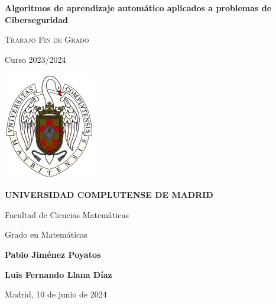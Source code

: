 \documentclass[11pt, a4paper]{article} %
\begin{document}
\begin{titlepage}
	
	\vspace*{1.7cm}
	
    \centering

	
	{\LARGE \textbf{Algoritmos de aprendizaje automático aplicados a problemas de Ciberseguridad}\par}
    \vspace{1.3cm}
    {\LARGE \textsc{Trabajo Fin de Grado}\par}
    \vspace{1.1cm}
    {\Large Curso 2023/2024\par}
    \vfill
	
    \includegraphics[width=0.3\textwidth]{logo_UCM.png}\par
    \vspace{1cm}
    {\LARGE \textsc{\textbf{UNIVERSIDAD COMPLUTENSE DE MADRID}}\par}
    \vspace{0.5cm}
    {\large Facultad de Ciencias Matemáticas\par}
    \vspace{0.5cm}
    {\large Grado en Matemáticas\par}
    \vfill

    

    \begin{minipage}{0.45\textwidth}
        \begin{flushleft}
            \textbf{Pablo Jiménez Poyatos}
        \end{flushleft}
    \end{minipage}
    
    \vspace{0.5cm}
    
    \begin{minipage}{0.45\textwidth}
        \begin{flushleft}
            \textbf{Luis Fernando Llana Díaz}
        \end{flushleft}
    \end{minipage}

    \vfill
    \vfill
    \vfill

	\begin{flushright}
            Madrid, 10 de junio de 2024
        \end{flushright}
    
\end{titlepage}
\end{document}
